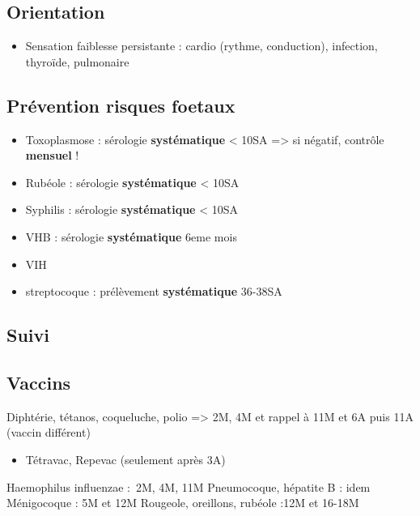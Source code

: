 \documentclass[11pt]{article}
\begin{document}
\subsection{Orientation}
\label{sec:org036b1fb}
\begin{itemize}
\item Sensation faiblesse persistante : cardio (rythme, conduction), infection, thyroïde, pulmonaire
\end{itemize}
\subsection{Prévention risques foetaux}
\label{sec:org49f9524}
\begin{itemize}
\item Toxoplasmose : sérologie \textbf{systématique} < 10SA => si négatif, contrôle \textbf{mensuel} !
\item Rubéole : sérologie \textbf{systématique} < 10SA
\item Syphilis : sérologie \textbf{systématique} < 10SA
\item VHB : sérologie \textbf{systématique} 6eme mois
\item VIH
\item streptocoque : prélèvement \textbf{systématique} 36-38SA
\end{itemize}

\subsection{Suivi}
\label{sec:org93cb8df}
\subsection{Vaccins}
\label{sec:org9336543}
Diphtérie, tétanos, coqueluche, polio => 2M, 4M et rappel à 11M et 6A puis 11A
(vaccin différent)
\begin{itemize}
\item Tétravac, Repevac (seulement après 3A)
\end{itemize}
Haemophilus influenzae : 2M, 4M, 11M
Pneumocoque, hépatite B : idem
Ménigocoque : 5M et 12M
Rougeole, oreillons, rubéole :12M et 16-18M
\end{document}
